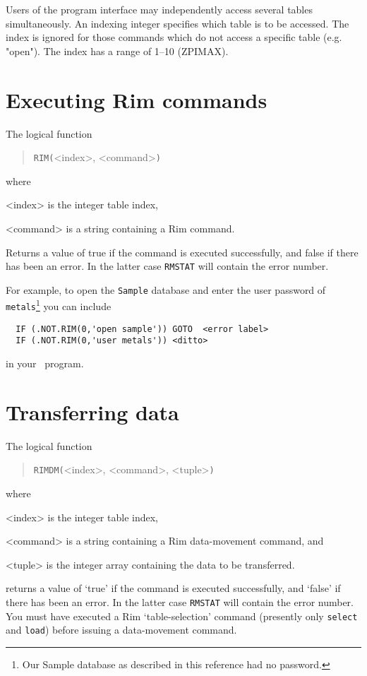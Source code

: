 \documentclass[11pt,a4paper]{report}
\begin{document}
Users of the program interface may independently access several
tables simultaneously.  An indexing integer specifies which
table is to be accessed.
The index is ignored for
those commands which do not access
a specific table (e.g. "open").
The index has a range of 1--10 (ZPIMAX).
 
 
\section{Executing Rim commands}
%
The logical function
\begin{verse}
    \verb!RIM(!<index>, <command>\verb!)!
\end{verse}

where
\begin{List}
  \item[<index>] is the integer table index,
  \item[<command>] is a string containing a Rim command.
\end{List}

Returns a value of true if the command is executed successfully,
and false if there has been an error.  In the latter case
\verb!RMSTAT!  will contain the error number.
 
For example, to open the \verb!Sample! database and enter the
user password of \verb!metals!\footnote{Our Sample database
as described in this reference had no password.}
you can include
 
\begin{verbatim}
  IF (.NOT.RIM(0,'open sample')) GOTO  <error label>
  IF (.NOT.RIM(0,'user metals')) <ditto>
\end{verbatim}
 
in your \Fortran\ program.
 
\section{Transferring data}
%
The logical function
\begin{verse}
  \verb!RIMDM(!<index>, <command>, <tuple>\verb!)!
\end{verse}
where
\begin{List}
  \item[<index>] is the integer table index,
  \item[<command>] is a string containing a Rim data-movement command, and
  \item[ <tuple>] is the integer array containing the data to be transferred.
\end{List}
returns a value of `true' if the command is executed successfully,
and `false' if there has been an error.  In the latter case
\verb!RMSTAT!  will contain the error number.
You must have executed a Rim `table-selection' command
(presently only \verb!select! and \verb!load!)
before issuing a data-movement command.
 
\end{document}
